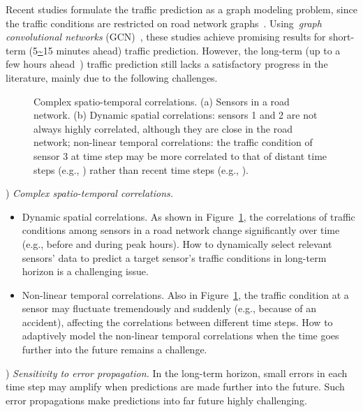 \documentclass[letterpaper]{article} \usepackage{aaai20}  \usepackage{times}  \usepackage{helvet} \usepackage{courier}  \usepackage[hyphens]{url}  \usepackage{graphicx} \usepackage{amsmath}
\begin{document}
Recent studies formulate the traffic prediction as a graph modeling problem, since the traffic conditions are restricted on road network graphs~\cite{Li-et-al:ICLR2018,Yu-et-al:IJCAI2018,Wu-et-al:IJCAI2019}. Using~\textit{graph convolutional networks} (GCN)~\cite{Defferrard-et-al:NIPS2016}, these studies achieve promising results for short-term (5\url{~}15 minutes ahead) traffic prediction. However, the long-term (up to a few hours ahead~\cite{Hou-and-Li:TITS2016}) traffic prediction still lacks a satisfactory progress in the literature, mainly due to the following challenges.

\begin{figure}
	\centering
	\hspace{0.0 \columnwidth}
	\caption{Complex spatio-temporal correlations. (a) Sensors in a road network. (b) Dynamic spatial correlations: sensors 1 and 2 are not always highly correlated, although they are close in the road network; non-linear temporal correlations: the traffic condition of sensor 3 at time step  may be more correlated to that of distant time steps (e.g., ) rather than recent time steps (e.g., ).}
	\label{Figure1} 
\end{figure}

) \textit{Complex spatio-temporal correlations.}
\begin{itemize}
	\item Dynamic spatial correlations. As shown in Figure~\ref{Figure1}, the correlations of traffic conditions among sensors in a road network change significantly over time (e.g., before and during peak hours). How to dynamically select relevant sensors' data to predict a target sensor's traffic conditions in long-term horizon is a challenging issue.
	\item Non-linear temporal correlations. Also in Figure~\ref{Figure1}, the traffic condition at a sensor may fluctuate tremendously and suddenly (e.g., because of an accident), affecting the correlations between different time steps. How to adaptively model the non-linear temporal correlations when the time goes further into the future remains a challenge.
\end{itemize}

) \textit{Sensitivity to error propagation.} In the long-term horizon, small errors in each time step may amplify when predictions are made further into the future. Such error propagations make predictions into far future highly challenging.
\end{document}
